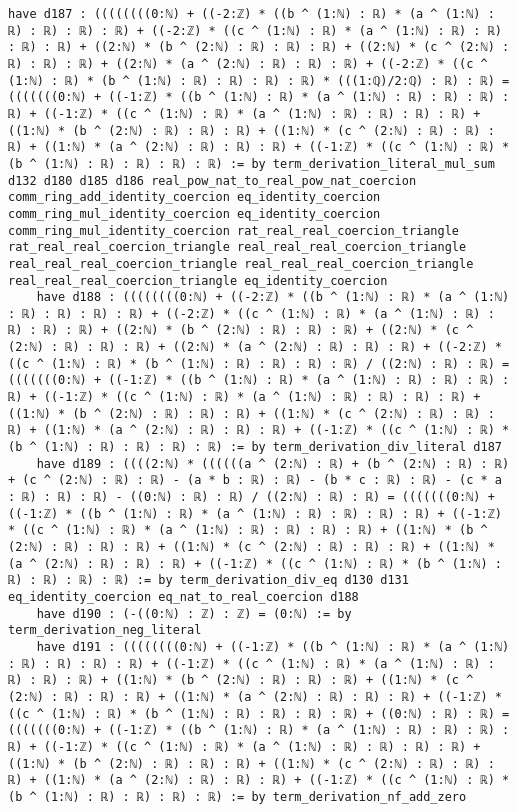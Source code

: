 \documentclass{article}
\begin{document}
\begin{tcolorbox}[colback=white!10, width=\linewidth]
\begin{lstlisting}[language=Lean4]
    have d187 : ((((((((0:ℕ) + ((-2:ℤ) * ((b ^ (1:ℕ) : ℝ) * (a ^ (1:ℕ) : ℝ) : ℝ) : ℝ) : ℝ) + ((-2:ℤ) * ((c ^ (1:ℕ) : ℝ) * (a ^ (1:ℕ) : ℝ) : ℝ) : ℝ) : ℝ) + ((2:ℕ) * (b ^ (2:ℕ) : ℝ) : ℝ) : ℝ) + ((2:ℕ) * (c ^ (2:ℕ) : ℝ) : ℝ) : ℝ) + ((2:ℕ) * (a ^ (2:ℕ) : ℝ) : ℝ) : ℝ) + ((-2:ℤ) * ((c ^ (1:ℕ) : ℝ) * (b ^ (1:ℕ) : ℝ) : ℝ) : ℝ) : ℝ) * (((1:ℚ)/2:ℚ) : ℝ) : ℝ) = (((((((0:ℕ) + ((-1:ℤ) * ((b ^ (1:ℕ) : ℝ) * (a ^ (1:ℕ) : ℝ) : ℝ) : ℝ) : ℝ) + ((-1:ℤ) * ((c ^ (1:ℕ) : ℝ) * (a ^ (1:ℕ) : ℝ) : ℝ) : ℝ) : ℝ) + ((1:ℕ) * (b ^ (2:ℕ) : ℝ) : ℝ) : ℝ) + ((1:ℕ) * (c ^ (2:ℕ) : ℝ) : ℝ) : ℝ) + ((1:ℕ) * (a ^ (2:ℕ) : ℝ) : ℝ) : ℝ) + ((-1:ℤ) * ((c ^ (1:ℕ) : ℝ) * (b ^ (1:ℕ) : ℝ) : ℝ) : ℝ) : ℝ) := by term_derivation_literal_mul_sum d132 d180 d185 d186 real_pow_nat_to_real_pow_nat_coercion comm_ring_add_identity_coercion eq_identity_coercion comm_ring_mul_identity_coercion eq_identity_coercion comm_ring_mul_identity_coercion rat_real_real_coercion_triangle rat_real_real_coercion_triangle real_real_real_coercion_triangle real_real_real_coercion_triangle real_real_real_coercion_triangle real_real_real_coercion_triangle eq_identity_coercion
    have d188 : ((((((((0:ℕ) + ((-2:ℤ) * ((b ^ (1:ℕ) : ℝ) * (a ^ (1:ℕ) : ℝ) : ℝ) : ℝ) : ℝ) + ((-2:ℤ) * ((c ^ (1:ℕ) : ℝ) * (a ^ (1:ℕ) : ℝ) : ℝ) : ℝ) : ℝ) + ((2:ℕ) * (b ^ (2:ℕ) : ℝ) : ℝ) : ℝ) + ((2:ℕ) * (c ^ (2:ℕ) : ℝ) : ℝ) : ℝ) + ((2:ℕ) * (a ^ (2:ℕ) : ℝ) : ℝ) : ℝ) + ((-2:ℤ) * ((c ^ (1:ℕ) : ℝ) * (b ^ (1:ℕ) : ℝ) : ℝ) : ℝ) : ℝ) / ((2:ℕ) : ℝ) : ℝ) = (((((((0:ℕ) + ((-1:ℤ) * ((b ^ (1:ℕ) : ℝ) * (a ^ (1:ℕ) : ℝ) : ℝ) : ℝ) : ℝ) + ((-1:ℤ) * ((c ^ (1:ℕ) : ℝ) * (a ^ (1:ℕ) : ℝ) : ℝ) : ℝ) : ℝ) + ((1:ℕ) * (b ^ (2:ℕ) : ℝ) : ℝ) : ℝ) + ((1:ℕ) * (c ^ (2:ℕ) : ℝ) : ℝ) : ℝ) + ((1:ℕ) * (a ^ (2:ℕ) : ℝ) : ℝ) : ℝ) + ((-1:ℤ) * ((c ^ (1:ℕ) : ℝ) * (b ^ (1:ℕ) : ℝ) : ℝ) : ℝ) : ℝ) := by term_derivation_div_literal d187
    have d189 : ((((2:ℕ) * ((((((a ^ (2:ℕ) : ℝ) + (b ^ (2:ℕ) : ℝ) : ℝ) + (c ^ (2:ℕ) : ℝ) : ℝ) - (a * b : ℝ) : ℝ) - (b * c : ℝ) : ℝ) - (c * a : ℝ) : ℝ) : ℝ) - ((0:ℕ) : ℝ) : ℝ) / ((2:ℕ) : ℝ) : ℝ) = (((((((0:ℕ) + ((-1:ℤ) * ((b ^ (1:ℕ) : ℝ) * (a ^ (1:ℕ) : ℝ) : ℝ) : ℝ) : ℝ) + ((-1:ℤ) * ((c ^ (1:ℕ) : ℝ) * (a ^ (1:ℕ) : ℝ) : ℝ) : ℝ) : ℝ) + ((1:ℕ) * (b ^ (2:ℕ) : ℝ) : ℝ) : ℝ) + ((1:ℕ) * (c ^ (2:ℕ) : ℝ) : ℝ) : ℝ) + ((1:ℕ) * (a ^ (2:ℕ) : ℝ) : ℝ) : ℝ) + ((-1:ℤ) * ((c ^ (1:ℕ) : ℝ) * (b ^ (1:ℕ) : ℝ) : ℝ) : ℝ) : ℝ) := by term_derivation_div_eq d130 d131 eq_identity_coercion eq_nat_to_real_coercion d188
    have d190 : (-((0:ℕ) : ℤ) : ℤ) = (0:ℕ) := by term_derivation_neg_literal
    have d191 : ((((((((0:ℕ) + ((-1:ℤ) * ((b ^ (1:ℕ) : ℝ) * (a ^ (1:ℕ) : ℝ) : ℝ) : ℝ) : ℝ) + ((-1:ℤ) * ((c ^ (1:ℕ) : ℝ) * (a ^ (1:ℕ) : ℝ) : ℝ) : ℝ) : ℝ) + ((1:ℕ) * (b ^ (2:ℕ) : ℝ) : ℝ) : ℝ) + ((1:ℕ) * (c ^ (2:ℕ) : ℝ) : ℝ) : ℝ) + ((1:ℕ) * (a ^ (2:ℕ) : ℝ) : ℝ) : ℝ) + ((-1:ℤ) * ((c ^ (1:ℕ) : ℝ) * (b ^ (1:ℕ) : ℝ) : ℝ) : ℝ) : ℝ) + ((0:ℕ) : ℝ) : ℝ) = (((((((0:ℕ) + ((-1:ℤ) * ((b ^ (1:ℕ) : ℝ) * (a ^ (1:ℕ) : ℝ) : ℝ) : ℝ) : ℝ) + ((-1:ℤ) * ((c ^ (1:ℕ) : ℝ) * (a ^ (1:ℕ) : ℝ) : ℝ) : ℝ) : ℝ) + ((1:ℕ) * (b ^ (2:ℕ) : ℝ) : ℝ) : ℝ) + ((1:ℕ) * (c ^ (2:ℕ) : ℝ) : ℝ) : ℝ) + ((1:ℕ) * (a ^ (2:ℕ) : ℝ) : ℝ) : ℝ) + ((-1:ℤ) * ((c ^ (1:ℕ) : ℝ) * (b ^ (1:ℕ) : ℝ) : ℝ) : ℝ) : ℝ) := by term_derivation_nf_add_zero

\end{lstlisting}
\end{tcolorbox}
\end{document}
